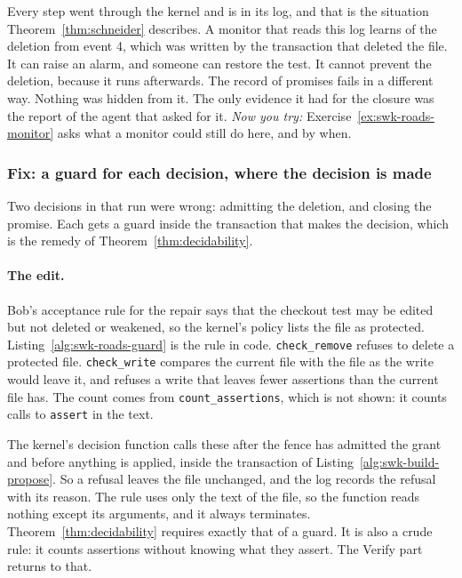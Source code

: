 Every step went through the kernel and is in its log, and that is the
situation Theorem~\ref{thm:schneider} describes. A monitor that reads this log
learns of the deletion from event 4, which was written by the transaction
that deleted the file. It can raise an alarm, and someone can restore the
test. It cannot prevent the deletion, because it runs afterwards. The record
of promises fails in a different way. Nothing was hidden from it. The only
evidence it had for the closure was the report of the agent that asked for
it. \emph{Now you try:} Exercise~\ref{ex:swk-roads-monitor} asks what a
monitor could still do here, and by when.

\subsubsection{Fix: a guard for each decision, where the decision is made}

Two decisions in that run were wrong: admitting the deletion, and closing
the promise. Each gets a guard inside the transaction that makes the
decision, which is the remedy of Theorem~\ref{thm:decidability}.

\paragraph{The edit.} Bob's acceptance rule for the repair says that the
checkout test may be edited but not deleted or weakened, so the kernel's
policy lists the file as protected. Listing~\ref{alg:swk-roads-guard} is the
rule in code. \texttt{check\_remove} refuses to delete a protected file.
\texttt{check\_write} compares the current file with the file as the write
would leave it, and refuses a write that leaves fewer assertions than the
current file has. The count comes from \texttt{count\_assertions}, which is
not shown: it counts calls to \texttt{assert} in the text.


The kernel's decision function calls these after the fence has admitted
the grant and before anything is applied, inside the transaction of
Listing~\ref{alg:swk-build-propose}. So a refusal leaves the file unchanged,
and the log records the refusal with its reason. The rule uses only the text
of the file, so the function reads nothing except its arguments, and it
always terminates. Theorem~\ref{thm:decidability} requires exactly that of a
guard. It is also a crude rule: it counts assertions without knowing what
they assert. The Verify part returns to that.

